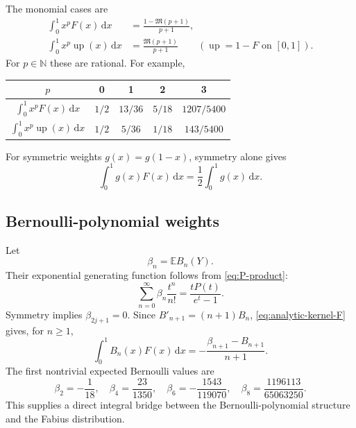 \documentclass[11pt,oneside]{article}
\theoremstyle{definition}
\newcommand{\F}{F}
\newcommand{\upf}{\operatorname{up}}
\newcommand{\M}{\mathfrak M}
\newcommand{\E}{\mathbb E}
\newcommand{\N}{\mathbb N}
\newcommand{\dd}{\,\mathrm d}
\begin{document}
The monomial cases are
\begin{align}
 \int_0^1x^p\F(x)\dd x&=\frac{1-\M(p+1)}{p+1},
 \label{eq:monomial-F-definite}\\
 \int_0^1x^p\upf(x)\dd x&=\frac{\M(p+1)}{p+1}
 \qquad(\upf=1-\F\text{ on }[0,1]).
 \label{eq:monomial-up-definite}
\end{align}
For \(p\in\N\) these are rational.  For example,
\begin{center}
\begin{tabular}{@{}c|cccc@{}}
\toprule
\(p\)&0&1&2&3\\
\midrule
\(\int_0^1x^p\F(x)\dd x\)&\(1/2\)&\(13/36\)&\(5/18\)&\(1207/5400\)\\
\(\int_0^1x^p\upf(x)\dd x\)&\(1/2\)&\(5/36\)&\(1/18\)&\(143/5400\)\\
\bottomrule
\end{tabular}
\end{center}

For symmetric weights \(g(x)=g(1-x)\), symmetry alone gives
\begin{equation}\label{eq:symmetric-weight}
 \int_0^1g(x)\F(x)\dd x=\frac12\int_0^1g(x)\dd x.
\end{equation}

\subsection{Bernoulli-polynomial weights}

Let
\begin{equation}\label{eq:beta-n-def}
 \beta_n=\E B_n(Y).
\end{equation}
Their exponential generating function follows from \cref{eq:P-product}:
\begin{equation}\label{eq:beta-egf}
 \sum_{n=0}^{\infty}\beta_n\frac{t^n}{n!}
 =\frac{tP(t)}{e^t-1}.
\end{equation}
Symmetry implies \(\beta_{2j+1}=0\).  Since
\(B'_{n+1}=(n+1)B_n\), \cref{eq:analytic-kernel-F} gives, for \(n\ge1\),
\begin{equation}\label{eq:Bernoulli-F-integral}
 \int_0^1B_n(x)\F(x)\dd x
 =-\frac{\beta_{n+1}-B_{n+1}}{n+1}.
\end{equation}
The first nontrivial expected Bernoulli values are
\begin{equation}\label{eq:beta-values}
 \beta_2=-\frac1{18},\quad
 \beta_4=\frac{23}{1350},\quad
 \beta_6=-\frac{1543}{119070},\quad
 \beta_8=\frac{1196113}{65063250}.
\end{equation}
This supplies a direct integral bridge between the Bernoulli-polynomial structure and
the Fabius distribution.
\end{document}
